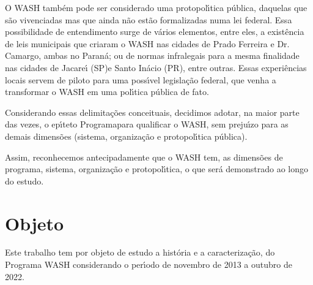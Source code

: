 \documentclass[
12pt,		%
openright,	%
twoside,  %
a4paper,			%
chapter=TITLE,		%
english,			%
french,				%
spanish,			%
brazil				%
]{USPSC-classe/USPSC}
\begin{document}
O WASH tamb\'em pode ser considerado uma protopol\'{\i}tica p\'ublica, daquelas que s\~ao vivenciadas mas que ainda n\~ao est\~ao formalizadas numa lei federal. Essa possibilidade de entendimento surge de v\'arios elementos, entre eles, a exist\^encia de leis municipais que criaram o WASH nas cidades de Prado Ferreira e Dr. Camargo, ambas no Paran\'a; ou de normas infralegais para a mesma finalidade nas cidades de Jacare\'{\i} (SP)e Santo In\'acio (PR), entre outras. Essas experi\^encias locais servem de piloto para uma poss\'{\i}vel legisla\c{c}\~ao federal, que venha a transformar o WASH em uma pol\'{\i}tica p\'ublica de fato.

















Considerando essas delimita\c{c}\~oes conceituais, decidimos adotar, na maior parte das vezes, o ep\'{\i}teto \textquotedbl Programa\textquotedbl  para qualificar o WASH, sem preju\'{\i}zo para as demais dimens\~oes (sistema, organiza\c{c}\~ao e protopol\'{\i}tica p\'ublica).

















Assim, reconhecemos antecipadamente que o WASH tem, as dimens\~oes de programa, sistema, organiza\c{c}\~ao e protopol\'{\i}tica, o que ser\'a demonstrado ao longo do estudo.

















\section[Objeto]{Objeto}\label{Objeto}
Este trabalho tem por objeto de estudo a hist\'oria e a caracteriza\c{c}\~ao, do Programa WASH considerando o per\'{\i}odo de novembro de 2013 a outubro de 2022.
\end{document}
